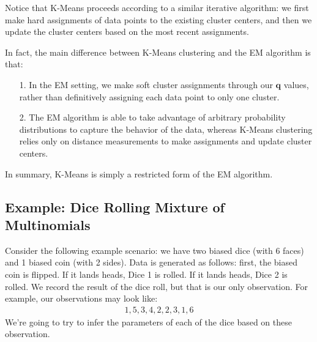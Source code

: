 Notice that K-Means proceeds according to a similar iterative algorithm: we first make hard assignments of data points to the existing cluster centers, and then we update the cluster centers based on the most recent assignments.

In fact, the main difference between K-Means clustering and the EM algorithm is that:

\begin{itemize}
    \item[1.] In the EM setting, we make soft cluster assignments through our $\textbf{q}$ values, rather than definitively assigning each data point to only one cluster.
    \item[2.] The EM algorithm is able to take advantage of arbitrary probability distributions to capture the behavior of the data, whereas K-Means clustering relies only on distance measurements to make assignments and update cluster centers.
\end{itemize}

In summary, K-Means is simply a restricted form of the EM algorithm.

\subsection{Example: Dice Rolling Mixture of Multinomials}
Consider the following example scenario: we have two biased dice (with 6 faces) and 1 biased coin (with 2 sides). Data is generated as follows: first, the biased coin is flipped. If it lands heads, Dice 1 is rolled. If it lands heads, Dice 2 is rolled. We record the result of the dice roll, but that is our only observation. For example, our observations may look like:
\begin{align*}
    1, 5, 3, 4, 2, 2, 3, 1, 6
\end{align*}
We're going to try to infer the parameters of each of the dice based on these observation.

